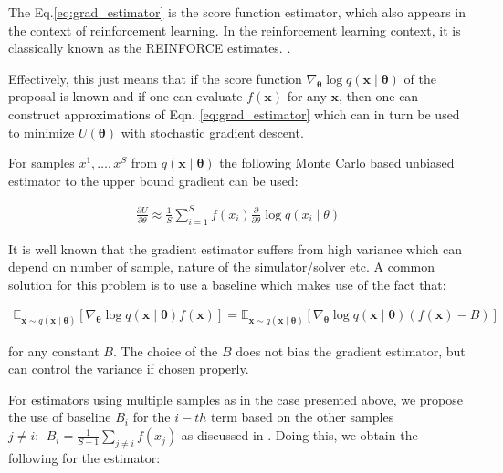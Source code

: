 \begin{itemize}
The Eq.\ref{eq:grad_estimator} is the score function estimator\cite{glynn1990likelihood}, which also appears in the context of reinforcement learning. In the reinforcement learning context, it is classically known as the REINFORCE estimates. \cite{williams1992simple}. 

Effectively, this just means that if the score function $\nabla_{\boldsymbol{\theta}} \log q(\boldsymbol{x} \mid \boldsymbol{\theta})$ of the proposal is known and if one can evaluate $f(\bm{x})$ for any $\bm{x}$, then one can construct approximations of Eqn. \ref{eq:grad_estimator} which can in turn be used to minimize $U(\boldsymbol{\theta})$ with stochastic gradient descent. 

For samples $x^1, \dotsc, x^S$ from $q(\boldsymbol{x} \mid \boldsymbol{\theta})$  the following Monte Carlo based unbiased estimator to the upper bound gradient can be used:

\begin{align}
	\frac{\partial U}{\partial \theta} \approx \frac{1}{S} \sum_{i=1}^{S} f\left(x_i\right) \frac{\partial}{\partial \theta} \log q\left(x_i \mid \theta\right)
\end{align}

It is well known that the gradient estimator suffers from high variance which can depend on number of sample, nature of the simulator/solver etc. A common solution for this problem is to use a baseline \cite{williams1992simple} which makes use of the fact that:

\begin{align}
	\mathbb{E}_{\boldsymbol{x} \sim q(\boldsymbol{x} \mid \boldsymbol{\theta})}\left[\nabla_{\boldsymbol{\theta}} \log q(\boldsymbol{x} \mid \boldsymbol{\theta}) f(\boldsymbol{x})\right] = \mathbb{E}_{\boldsymbol{x} \sim q(\boldsymbol{x} \mid \boldsymbol{\theta})}\left[\nabla_{\boldsymbol{\theta}} \log q(\boldsymbol{x} \mid \boldsymbol{\theta}) (f(\boldsymbol{x}) - B)\right]
\end{align}

for any constant $B$. The choice of the $B$ does not bias the gradient estimator, but can control the variance if chosen properly. 

For estimators using multiple samples as in the case presented above, we propose the use of baseline $B_i$ for the $i-th$ term based on the other samples $j\neq i: ~~ B_i = \frac{1}{S-1} \sum_{j\neq i}f(x_j)$ as discussed in \cite{kool_buy_2022}. Doing this, we obtain the following for the estimator:


\end{itemize}
